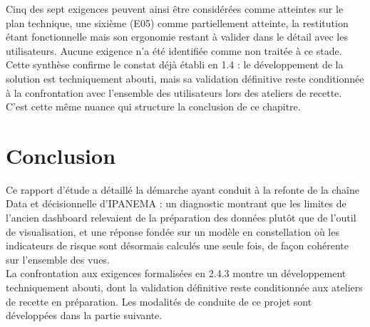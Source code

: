 Cinq des sept exigences peuvent ainsi être considérées comme atteintes sur le plan technique, 
une sixième (E05) comme partiellement atteinte, la restitution étant fonctionnelle mais son 
ergonomie restant à valider dans le détail avec les utilisateurs. Aucune exigence n'a été 
identifiée comme non traitée à ce stade. \\
Cette synthèse confirme le constat déjà établi en 1.4 : le développement de la solution est 
techniquement abouti, mais sa validation définitive reste conditionnée à la confrontation avec l'ensemble des utilisateurs lors des ateliers de recette. C'est cette même nuance qui structure 
la conclusion de ce chapitre.
 
\section{Conclusion}
Ce rapport d'étude a détaillé la démarche ayant conduit à la refonte de la chaîne Data et 
décisionnelle d'IPANEMA : un diagnostic montrant que les limites de l'ancien dashboard 
relevaient de la préparation des données plutôt que de l'outil de visualisation, et une réponse 
fondée sur un modèle en constellation où les indicateurs de risque sont désormais calculés 
une seule fois, de façon cohérente sur l'ensemble des vues. \\
La confrontation aux exigences formalisées en 2.4.3 montre un développement 
techniquement abouti, dont la validation définitive reste conditionnée aux ateliers de recette 
en préparation. Les modalités de conduite de ce projet sont développées dans la partie 
suivante.

\setlength{\emergencystretch}{0pt}
